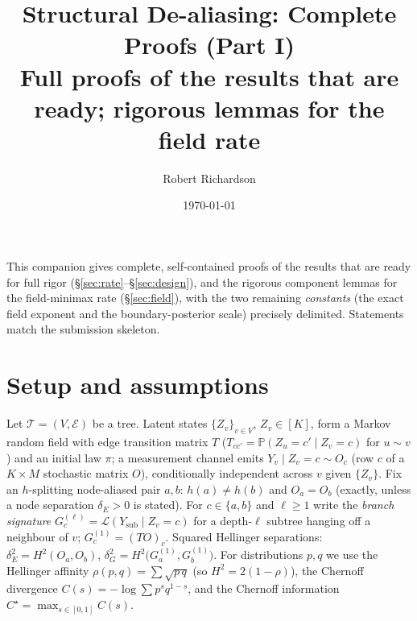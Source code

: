 \documentclass[11pt]{article}
\title{\textbf{Structural De-aliasing: Complete Proofs (Part I)}\\[3pt]
\large Full proofs of the results that are ready; rigorous lemmas for the field rate}
\author{Robert Richardson}\date{\today}
\theoremstyle{plain}
\theoremstyle{definition}\newtheorem{assumption}{Assumption}\newtheorem{remark}{Remark}
\newcommand{\Pf}{\mathbb{P}}\newcommand{\I}{\mathbb{1}}\newcommand{\HH}{\mathbb{H}}\newcommand{\TV}{\mathrm{TV}}
\begin{document}
\maketitle
\noindent This companion gives complete, self-contained proofs of the results that are ready for full rigor
(\S\ref{sec:rate}--\S\ref{sec:design}), and the rigorous component lemmas for the field-minimax rate
(\S\ref{sec:field}), with the two remaining \emph{constants} (the exact field exponent and the boundary-posterior
scale) precisely delimited. Statements match the submission skeleton.

\section{Setup and assumptions}
Let $\mathcal T=(V,\mathcal E)$ be a tree. Latent states $\{Z_v\}_{v\in V}$, $Z_v\in[K]$, form a Markov random
field with edge transition matrix $T$ ($T_{cc'}=\Pf(Z_u{=}c'\mid Z_v{=}c)$ for $u\sim v$) and an initial law
$\pi$; a measurement channel emits $Y_v\mid Z_v{=}c\sim O_c$ (row $c$ of a $K\times M$ stochastic matrix $O$),
conditionally independent across $v$ given $\{Z_v\}$. Fix an $h$-splitting node-aliased pair $a,b$: $h(a)\neq h(b)$
and $O_a=O_b$ (exactly, unless a node separation $\delta_E>0$ is stated). For $c\in\{a,b\}$ and $\ell\ge1$ write the
\emph{branch signature} $G_c^{(\ell)}=\mathcal L(Y_{\mathrm{sub}}\mid Z_v{=}c)$ for a depth-$\ell$ subtree hanging
off a neighbour of $v$; $G_c^{(1)}=(TO)_c$. Squared Hellinger separations: $\delta_E^2=H^2(O_a,O_b)$,
$\delta_G^2=H^2\!\big(G_a^{(1)},G_b^{(1)}\big)$. For distributions $p,q$ we use the Hellinger affinity
$\rho(p,q)=\sum\sqrt{p\,q}$ (so $H^2=2(1-\rho)$), the Chernoff divergence $C(s)=-\log\sum p^s q^{1-s}$, and the
Chernoff information $C^\star=\max_{s\in[0,1]}C(s)$.
\end{document}
